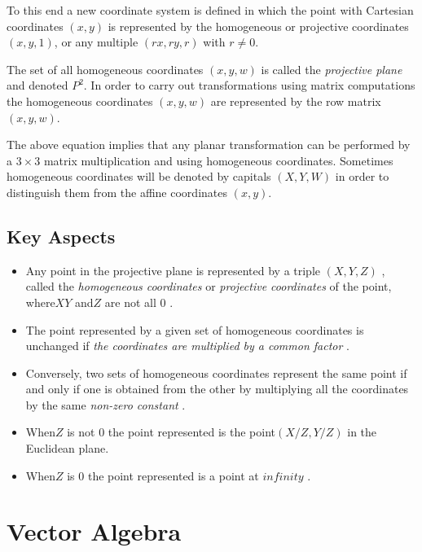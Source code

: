 \documentclass[12pt]{report}
\begin{document}
To this end a new coordinate system is defined in which the point with Cartesian coordinates $ (x , y) $ is represented by the homogeneous or projective coordinates $( x , y , 1 )$, or any multiple $( rx , ry , r )$ with $ r \neq 0 $.


\vspace{.5cm}
The set of all homogeneous coordinates $(x , y , w)$ is called the \textit{projective plane} and denoted $ P^2 $. In order to carry out transformations using matrix computations the homogeneous coordinates $( x, y, w )$ are represented by the row matrix $(x, y, w)$. 

\vspace{.5cm}

\hspace{1cm} The above equation implies that any planar transformation can be performed by a $ 3 × 3 $ matrix multiplication and using homogeneous coordinates. Sometimes homogeneous coordinates will be denoted by capitals $ (X, Y, W) $  in order to distinguish them from the affine coordinates $(x, y)$.


\subsection{Key Aspects}
\begin{itemize}
  \item 
  Any point in the projective plane is represented by a triple $ (X,Y,Z) $ , called the\textit{ homogeneous coordinates } or\textit{ projective coordinates }of the point, where$ X Y $ and$ Z $ are not all $ 0 $ .
  \item 
  The point represented by a given set of homogeneous coordinates is unchanged if \textit{  the coordinates are multiplied by a common factor }.
  \item 
  Conversely, two sets of homogeneous coordinates represent the same point if and only if one is obtained from the other by multiplying all the coordinates by the same  \textit{ non-zero constant }.
  \item 
  When$ Z $ is not $ 0$  the point represented is the point$ (X/Z,Y/Z)$ in the Euclidean plane.
  \item 
  When$ Z $ is $ 0$  the point represented is a point at $ infinity $ .
\end{itemize}

\section{Vector Algebra}
\end{document}
